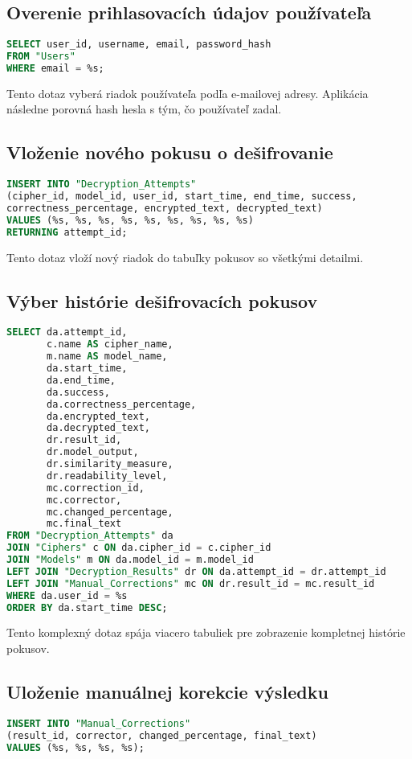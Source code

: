 \documentclass[12pt,a4paper]{article}
\begin{document}
\subsection{Overenie prihlasovacích údajov používateľa}
\begin{lstlisting}[language=SQL]
SELECT user_id, username, email, password_hash
FROM "Users"
WHERE email = %s;
\end{lstlisting}

Tento dotaz vyberá riadok používateľa podľa e-mailovej adresy. Aplikácia následne porovná hash hesla s tým, čo používateľ zadal.

\subsection{Vloženie nového pokusu o dešifrovanie}
\begin{lstlisting}[language=SQL]
INSERT INTO "Decryption_Attempts"
(cipher_id, model_id, user_id, start_time, end_time, success,
correctness_percentage, encrypted_text, decrypted_text)
VALUES (%s, %s, %s, %s, %s, %s, %s, %s, %s)
RETURNING attempt_id;
\end{lstlisting}

Tento dotaz vloží nový riadok do tabuľky pokusov so všetkými detailmi.

\subsection{Výber histórie dešifrovacích pokusov}
\begin{lstlisting}[language=SQL]
SELECT da.attempt_id,
       c.name AS cipher_name,
       m.name AS model_name,
       da.start_time,
       da.end_time,
       da.success,
       da.correctness_percentage,
       da.encrypted_text,
       da.decrypted_text,
       dr.result_id,
       dr.model_output,
       dr.similarity_measure,
       dr.readability_level,
       mc.correction_id,
       mc.corrector,
       mc.changed_percentage,
       mc.final_text
FROM "Decryption_Attempts" da
JOIN "Ciphers" c ON da.cipher_id = c.cipher_id
JOIN "Models" m ON da.model_id = m.model_id
LEFT JOIN "Decryption_Results" dr ON da.attempt_id = dr.attempt_id
LEFT JOIN "Manual_Corrections" mc ON dr.result_id = mc.result_id
WHERE da.user_id = %s
ORDER BY da.start_time DESC;
\end{lstlisting}

Tento komplexný dotaz spája viacero tabuliek pre zobrazenie kompletnej histórie pokusov.

\subsection{Uloženie manuálnej korekcie výsledku}
\begin{lstlisting}[language=SQL]
INSERT INTO "Manual_Corrections"
(result_id, corrector, changed_percentage, final_text)
VALUES (%s, %s, %s, %s);
\end{lstlisting}
\end{document}
